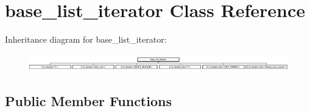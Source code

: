 \hypertarget{classbase__list__iterator}{}\section{base\+\_\+list\+\_\+iterator Class Reference}
\label{classbase__list__iterator}
Inheritance diagram for base\+\_\+list\+\_\+iterator\+:\begin{figure}[H]
\begin{center}
\leavevmode
\includegraphics[height=0.740741cm]{classbase__list__iterator}
\end{center}
\end{figure}
\subsection*{Public Member Functions}
